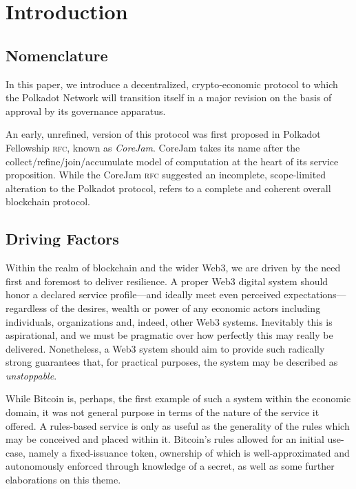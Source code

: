 \section{Introduction}

\subsection{Nomenclature}


In this paper, we introduce a decentralized, crypto-economic protocol to which the Polkadot Network will transition itself in a major revision on the basis of approval by its governance apparatus.

An early, unrefined, version of this protocol was first proposed in Polkadot Fellowship \textsc{rfc}, known as \emph{CoreJam}. CoreJam takes its name after the collect/refine/join/accumulate model of computation at the heart of its service proposition. While the CoreJam \textsc{rfc} suggested an incomplete, scope-limited alteration to the Polkadot protocol, \Jam refers to a complete and coherent overall blockchain protocol.

\subsection{Driving Factors}

Within the realm of blockchain and the wider Web3, we are driven by the need first and foremost to deliver resilience. A proper Web3 digital system should honor a declared service profile---and ideally meet even perceived expectations---regardless of the desires, wealth or power of any economic actors including individuals, organizations and, indeed, other Web3 systems. Inevitably this is aspirational, and we must be pragmatic over how perfectly this may really be delivered. Nonetheless, a Web3 system should aim to provide such radically strong guarantees that, for practical purposes, the system may be described as \emph{unstoppable}.

While Bitcoin is, perhaps, the first example of such a system within the economic domain, it was not general purpose in terms of the nature of the service it offered. A rules-based service is only as useful as the generality of the rules which may be conceived and placed within it. Bitcoin's rules allowed for an initial use-case, namely a fixed-issuance token, ownership of which is well-approximated and autonomously enforced through knowledge of a secret, as well as some further elaborations on this theme.

